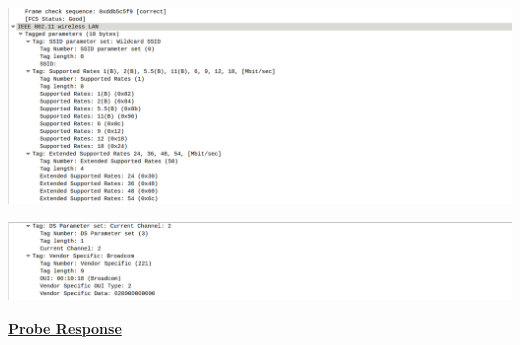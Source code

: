 \documentclass{article}
\begin{document}
\begin{center}
\includegraphics[scale=0.3]{WLAN/probreq5.png}
\end{center}
\begin{center}
\includegraphics[scale=0.3]{WLAN/probreq6.png}
\end{center}

\textbf{\underline{Probe Response}}
\end{document}

